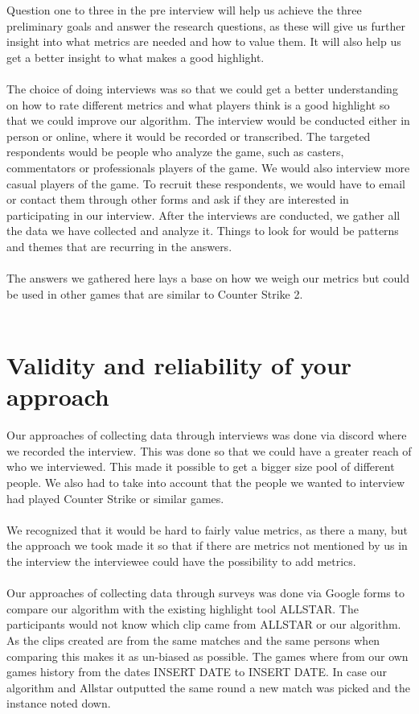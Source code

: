Question one to three in the pre interview will help us achieve the three preliminary goals and answer the research questions, as these will give us further insight into what metrics are needed and how to value them. It will also help us get a better insight to what makes a good highlight. \\\\
The choice of doing interviews was so that we could get a better understanding on how to rate different metrics and what players think is a good highlight so that we could improve our algorithm. The interview would be conducted either in person or online, where it would be recorded or transcribed. The targeted respondents would be people who analyze the game, such as casters, commentators or professionals players of the game. We would also interview more casual players of the game. To recruit these respondents, we would have to email or contact them through other forms and ask if they are interested in participating in our interview. After the interviews are conducted, we gather all the data we have collected and analyze it. Things to look for would be patterns and themes that are recurring in the answers.\\\\
The answers we gathered here lays a base on how we weigh our metrics but could be used in other games that are similar to Counter Strike 2.\\\\ 

\section{Validity and reliability of your approach}
Our approaches of collecting data through interviews was done via discord where we recorded the interview. This was done so that we could have a greater reach of who we interviewed. This made it possible to get a bigger size pool of different people. We also had to take into account that the people we wanted to interview had played Counter Strike or similar games.\\\\ We recognized that it would be hard to fairly value metrics, as there a many, but the approach we took made it so that if there are metrics not mentioned by us in the interview the interviewee could have the possibility to add metrics.\\\\
Our approaches of collecting data through surveys was done via Google forms to compare our algorithm with the existing highlight tool ALLSTAR. The participants would not know which clip came from ALLSTAR or our algorithm. As the clips created are from the same matches and the same persons when comparing this makes it as un-biased as possible. The games where from our own games history from the dates {INSERT DATE} to {INSERT DATE}. In case our algorithm and Allstar outputted the same round a new match was picked and the instance noted down. 